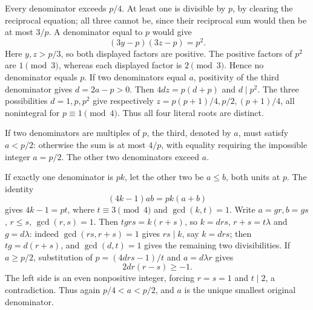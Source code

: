 Every denominator exceeds $p/4$. At least one is divisible by $p$, by clearing
the reciprocal equation; all three cannot be, since their reciprocal sum
would then be at most $3/p$. A denominator equal to $p$ would give
\[
 (3y-p)(3z-p)=p^2.
\]
Here $y,z>p/3$, so both displayed factors are positive. The positive factors
of $p^2$ are $1\pmod3$, whereas each displayed factor is $2\pmod3$. Hence no
denominator equals $p$. If two denominators equal $a$, positivity of the third
denominator gives $d=2a-p>0$. Then $4dz=p(d+p)$ and $d\mid p^2$. The three possibilities
$d=1,p,p^2$ give respectively $z=p(p+1)/4,p/2,(p+1)/4$, all nonintegral for
$p\equiv1\pmod4$. Thus all four literal roots are distinct.

If two denominators are multiples of $p$, the third, denoted by $a$, must satisfy
$a<p/2$: otherwise the sum is at most $4/p$, with equality requiring the
impossible integer $a=p/2$. The other two denominators exceed $a$.

If exactly one denominator is $pk$, let the other two be $a\le b$, both units
at $p$. The identity
\[
 (4k-1)ab=pk(a+b)
\]
gives $4k-1=pt$, where $t\equiv3\pmod4$ and $\gcd(k,t)=1$. Write
$a=gr,b=gs$, $r\le s$, $\gcd(r,s)=1$. Then $tgrs=k(r+s)$, so $k=drs$,
$r+s=t\lambda$ and $g=d\lambda$: indeed $\gcd(rs,r+s)=1$ gives
$rs\mid k$, say $k=drs$; then $tg=d(r+s)$, and $\gcd(d,t)=1$ gives the
remaining two divisibilities. If $a\ge p/2$, substitution of
$p=(4drs-1)/t$ and $a=d\lambda r$ gives
\[
 2dr(r-s)\ge-1.
\]
The left side is an even nonpositive integer, forcing $r=s=1$ and $t\mid2$,
a contradiction. Thus again $p/4<a<p/2$, and $a$ is the unique smallest
original denominator.

